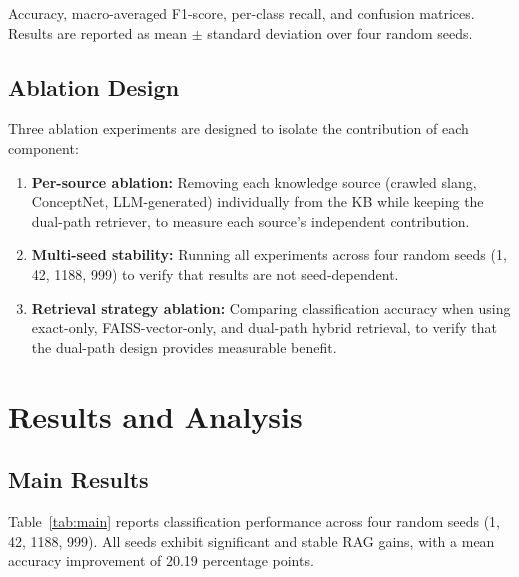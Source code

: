 \documentclass[conference]{IEEEtran}
\begin{document}
Accuracy, macro-averaged F1-score, per-class recall, and confusion matrices.
Results are reported as mean $\pm$ standard deviation over four random seeds.

\subsection{Ablation Design}

Three ablation experiments are designed to isolate the contribution of each
component:

\begin{enumerate}[leftmargin=*]
    \item \textbf{Per-source ablation:} Removing each knowledge source
    (crawled slang, ConceptNet, LLM-generated) individually from the KB while
    keeping the dual-path retriever, to measure each source's independent
    contribution.
    \item \textbf{Multi-seed stability:} Running all experiments across four
    random seeds (1, 42, 1188, 999) to verify that results are not seed-dependent.
    \item \textbf{Retrieval strategy ablation:} Comparing classification accuracy
    when using exact-only, FAISS-vector-only, and dual-path hybrid retrieval,
    to verify that the dual-path design provides measurable benefit.
\end{enumerate}

\section{Results and Analysis}

\subsection{Main Results}

Table~\ref{tab:main} reports classification performance across four random seeds
(1, 42, 1188, 999). All seeds exhibit significant and stable RAG gains, with a
mean accuracy improvement of 20.19 percentage points.
\end{document}
